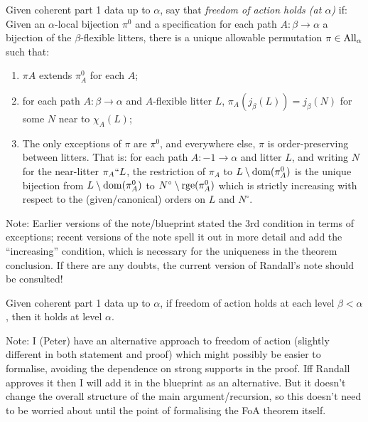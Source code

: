 \begin{definition}
  \label{def:freedom-of-action-statement}
  Given coherent part 1 data up to $\alpha$, say that \emph{freedom of action holds (at $\alpha$)} if: Given an $\alpha$-local bijection $\pi^0$ and a specification for each path $A : \beta \to \alpha$ a bijection of the $\beta$-flexible litters, there is a unique allowable permutation $\pi \in \mathrm{All}_\alpha$ such that:
  \begin{enumerate}
   \item $\pi{A}$ extends $\pi^0_{A}$ for each $A$;
   \item for each path $A : \beta \to \alpha$ and $A$-flexible litter $L$, $\pi_A(j_\beta(L)) = j_\beta(N)$ for some $N$ near to $\chi_A(L)$;
   \item The only exceptions of $\pi$ are $\pi^0$, and everywhere else, $\pi$ is order-preserving between litters.  That is: for each path $A : -1 \to \alpha$ and litter $L$, and writing $N$ for the near-litter $\pi_A``L$, the restriction of $\pi_A$ to $L \setminus \mathrm{dom}(\pi^0_A)$ is the unique bijection from $L \setminus \mathrm{dom}(\pi^0_A)$ to $N^\circ \setminus \mathrm{rge}(\pi^0_A)$ which is strictly increasing with respect to the (given/canonical) orders on $L$ and $N^\circ$.
  \end{enumerate}

  Note: Earlier versions of the note/blueprint stated the 3rd condition in terms of exceptions; recent versions of the note spell it out in more detail and add the “increasing” condition, which is necessary for the uniqueness in the theorem conclusion.  If there are any doubts, the current version of Randall’s note should be consulted!
\end{definition}

\begin{lemma}
\label{lem:freedom-of-action-propagates}
Given coherent part 1 data up to $\alpha$, if freedom of action holds at each level $\beta < \alpha$, then it holds at level $\alpha$.

Note: I (Peter) have an alternative approach to freedom of action (slightly different in both statement and proof) which might possibly be easier to formalise, avoiding the dependence on strong supports in the proof.  Iff Randall approves it then I will add it in the blueprint as an alternative.  But it doesn’t change the overall structure of the main argument/recursion, so this doesn’t need to be worried about until the point of formalising the FoA theorem itself.
\end{lemma}

